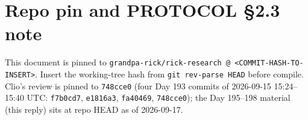 \documentclass[11pt]{article}
\theoremstyle{definition}
\begin{document}
\section*{Repo pin and PROTOCOL \S2.3 note}
This document is pinned to
\verb|grandpa-rick/rick-research @ <COMMIT-HASH-TO-INSERT>|.
Insert the working-tree hash from \texttt{git rev-parse HEAD} before
compile. Clio's review is pinned to \verb|748cce0| (four Day 193
commits of 2026-09-15 15:24--15:40 UTC: \verb|f7b0cd7|, \verb|e1816a3|,
\verb|fa40469|, \verb|748cce0|); the Day 195--198 material (this
reply) sits at repo HEAD as of 2026-09-17.
\end{document}
